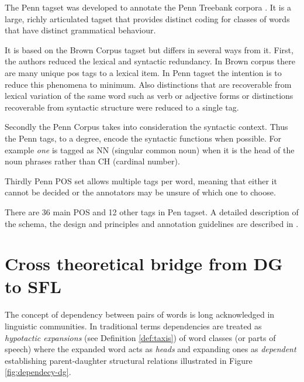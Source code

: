 The Penn tagset was developed to annotate the Penn Treebank corpora \citep{Marcus1993}. It is a large, richly articulated tagset that provides distinct coding for classes of words that have distinct grammatical behaviour.

It is based on the Brown Corpus tagset \citep{Kucera1968} but differs in several ways from it. First, the authors reduced the lexical and syntactic redundancy. In Brown corpus there are many unique pos tags to a lexical item. In Penn tagset the intention is to reduce this  phenomena to minimum. Also distinctions that are recoverable from lexical variation of the same word such as verb or adjective forms or distinctions recoverable from syntactic structure were reduced to a single tag. 

Secondly the Penn Corpus takes into consideration the syntactic context. Thus the Penn tags, to a degree, encode the syntactic functions when possible. For example \textit{one} is tagged as NN (singular common noun) when it is the head of the noun phrases rather than CH (cardinal number). 

Thirdly Penn POS set allows multiple tags per word, meaning that either it cannot be decided or the annotators may be unsure of which one to choose.  

There are 36 main POS and 12 other tags in Pen tagset. A detailed description of the schema, the design and principles and annotation guidelines are described in \citep{Santorini1990}. 

\section{Cross theoretical bridge from DG to SFL}
\label{sec:cross-theoretical-bridge}
\label{sec:dependecy-relations-sfl}

The concept of dependency between pairs of words is long acknowledged in linguistic communities. In traditional terms dependencies are treated as \textit{hypotactic expansions} (see Definition \ref{def:taxis}) of word classes (or parts of speech) where the expanded word acts as \textit{heads} and expanding ones as \textit{dependent} establishing parent-daughter structural relations illustrated in Figure \ref{fig:dependecy-dg}.



